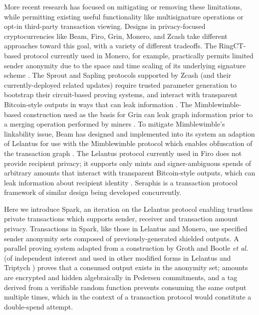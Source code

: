 \documentclass{llncs}
\begin{document}
More recent research has focused on mitigating or removing these limitations, while permitting existing useful functionality like multisignature operations or opt-in third-party transaction viewing.
Designs in privacy-focused cryptocurrencies like Beam, Firo, Grin, Monero, and Zcash take different approaches toward this goal, with a variety of different tradeoffs.
The RingCT-based protocol currently used in Monero, for example, practically permits limited sender anonymity due to the space and time scaling of its underlying signature scheme \cite{ringct,clsag}.
The Sprout and Sapling protocols supported by Zcash \cite{zcash} (and their currently-deployed related updates) require trusted parameter generation to bootstrap their circuit-based proving systems, and interact with transparent Bitcoin-style outputs in ways that can leak information \cite{zcash_sprout,zcash_sapling}.
The Mimblewimble-based construction used as the basis for Grin can leak graph information prior to a merging operation performed by miners \cite{mw}.
To mitigate Mimblewimble's linkability issue, Beam has designed and implemented into its system an adaption of Lelantus for use with the Mimblewimble protocol which enables obfuscation of the transaction graph \cite{LMW}.
The Lelantus protocol currently used in Firo does not provide recipient privacy; it supports only mints and signer-ambiguous spends of arbitrary amounts that interact with transparent Bitcoin-style outputs, which can leak information about recipient identity \cite{lelantus}.
Seraphis \cite{seraphis} is a transaction protocol framework of similar design being developed concurrently.

Here we introduce Spark, an iteration on the Lelantus protocol enabling trustless private transactions which supports sender, receiver and transaction amount privacy.
Transactions in Spark, like those in Lelantus and Monero, use specified sender anonymity sets composed of previously-generated shielded outputs.
A parallel proving system adapted from a construction by Groth and Bootle \textit{et al.} \cite{groth,bootle} (of independent interest and used in other modified forms in Lelantus\cite{lelantus} and Triptych \cite{triptych}) proves that a consumed output exists in the anonymity set; amounts are encrypted and hidden algebraically in Pedersen commitments, and a tag derived from a verifiable random function \cite{dodis,omniring} prevents consuming the same output multiple times, which in the context of a transaction protocol would constitute a double-spend attempt.
\end{document}
